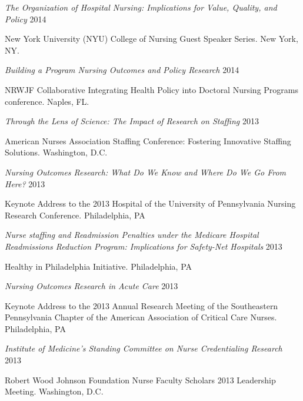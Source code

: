 \documentclass[10pt,]{article}
\begin{document}
{{{{{{{{{{{{{{{\begin{hangparas}{.5in}{1}
{\textit {The Organization of Hospital Nursing: Implications for Value, Quality, and Policy}} \hfill 2014 
\vspace{-2.5mm}
\begin{adjustwidth}{0.5cm}{1cm}
New York University (NYU) College of Nursing Guest Speaker Series. New York, NY.
\end{adjustwidth}

{\textit {Building a Program Nursing Outcomes and Policy Research}} \hfill 2014 
\vspace{-2.5mm}
\begin{adjustwidth}{0.5cm}{1cm}
NRWJF Collaborative Integrating Health Policy into Doctoral Nursing Programs conference. Naples, FL.
\end{adjustwidth}

{\textit {Through the Lens of Science: The Impact of Research on Staffing}} \hfill 2013 
\vspace{-2.5mm}
\begin{adjustwidth}{0.5cm}{1cm}
American Nurses Association Staffing Conference: Fostering Innovative Staffing Solutions. Washington, D.C.
\end{adjustwidth}

{\textit {Nursing Outcomes Research: What Do We Know and Where Do We Go From Here?}} \hfill 2013 
\vspace{-2.5mm}
\begin{adjustwidth}{0.5cm}{1cm}
Keynote Address to the 2013 Hospital of the University of Pennsylvania Nursing Research Conference. Philadelphia, PA
\end{adjustwidth}

{\textit {Nurse staffing and Readmission Penalties under the Medicare Hospital Readmissions Reduction Program: Implications for Safety-Net Hospitals}} \hfill 2013 
\vspace{-2.5mm}
\begin{adjustwidth}{0.5cm}{1cm}
Healthy in Philadelphia Initiative. Philadelphia, PA
\end{adjustwidth}

{\textit {Nursing Outcomes Research in Acute Care}} \hfill 2013 
\vspace{-2.5mm}
\begin{adjustwidth}{0.5cm}{1cm}
Keynote Address to the 2013 Annual Research Meeting of the Southeastern Pennsylvania Chapter of the American Association of Critical Care Nurses. Philadelphia, PA
\end{adjustwidth}

{\textit {Institute of Medicine’s Standing Committee on Nurse Credentialing Research}} \hfill 2013 
\vspace{-2.5mm}
\begin{adjustwidth}{0.5cm}{1cm}
Robert Wood Johnson Foundation Nurse Faculty Scholars 2013 Leadership Meeting. Washington, D.C.
\end{adjustwidth}


\end{hangparas}}}}}}}}}}}}}}}}
\end{document}
